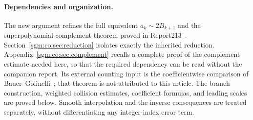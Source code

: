\documentclass[11pt,letterpaper]{article}
\theoremstyle{remark}\newtheorem{remark}[theorem]{Remark}
\theoremstyle{definition}\newtheorem{definition}[theorem]{Definition}
\begin{document}
\paragraph{Dependencies and organization.}
The new argument refines the full equivalent $a_k\sim2B_{k+1}$ and the superpolynomial complement theorem proved in Report213~\cite{r213}. Section~\ref{sgm:co:sec:reduction} isolates exactly the inherited reduction. Appendix~\ref{sgm:co:sec:complement} recalls a complete proof of the complement estimate needed here, so that the required dependency can be read without the companion report. Its external counting input is the coefficientwise comparison of Bauer--Golinelli~\cite{bg}; that theorem is not attributed to this article. The branch construction, weighted collision estimates, coefficient formulas, and leading scales are proved below. Smooth interpolation and the inverse consequences are treated separately, without differentiating any integer-index error term.
\end{document}
